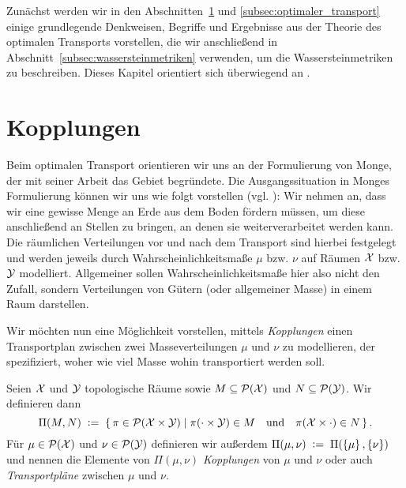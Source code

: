 \documentclass[../thesis/thesis.tex]{subfiles}
\begin{document}
	Zunächst werden wir in den Abschnitten~\ref{subsec:kopplungen} und \ref{subsec:optimaler_transport} einige grundlegende Denkweisen, Begriffe und Ergebnisse aus der Theorie des optimalen Transports vorstellen,
	die wir anschließend in Abschnitt~\ref{subsec:wassersteinmetriken} verwenden, um die Wassersteinmetriken zu beschreiben. Dieses Kapitel orientiert sich überwiegend an \cite[Chapter 4--6]{Villani.2009}.
	
	\section{Kopplungen}
	\label{subsec:kopplungen}
	
	Beim optimalen Transport orientieren wir uns an der Formulierung von Monge, der mit seiner Arbeit \cite{Monge.} das Gebiet begründete.  
	Die Ausgangssituation in Monges Formulierung können wir uns wie folgt vorstellen (vgl. \cite[S. 41--42]{Villani.2009}):
	Wir nehmen an, dass wir eine gewisse Menge an Erde aus dem Boden fördern müssen, um diese anschließend an Stellen zu bringen, an denen sie weiterverarbeitet werden kann. Die räumlichen Verteilungen vor und
	nach dem Transport sind hierbei festgelegt und werden jeweils durch Wahrscheinlichkeitsmaße $\mu$ bzw. $\nu$ auf Räumen $\mathcal{X}$ bzw. $\mathcal{Y}$ modelliert. 
	Allgemeiner sollen Wahrscheinlichkeitsmaße hier also nicht den Zufall, sondern Verteilungen von Gütern (oder allgemeiner Masse) in einem Raum darstellen.
	
	
	
	Wir möchten nun eine Möglichkeit vorstellen, mittels \emph{Kopplungen} einen Transportplan zwischen zwei Masseverteilungen $\mu$ und $\nu$ zu modellieren, der spezifiziert, woher wie viel Masse wohin transportiert werden soll.
	
	\begin{Definition}[Kopplung]
		Seien $\mathcal{X}$ und $\mathcal{Y}$ topologische Räume sowie $M \subseteq \mathcal{P}(\mathcal{X})$ und $N \subseteq \mathcal{P}(\mathcal{Y})$. Wir definieren dann
		\[ \Pi(M, N) \; \vcentcolon = \; \left\{\, \pi \in \mathcal{P}(\mathcal{X} \times \mathcal{Y}) \; \middle| \; \pi(\cdot \times \mathcal{Y}) \in M \quad \text{und} \quad \pi(\mathcal{X} \times \cdot) \in N \,\right\} \text{.}\]
		Für $\mu \in \mathcal{P}(\mathcal{X})$ und $\nu \in \mathcal{P}(\mathcal{Y})$ definieren wir außerdem $\Pi(\mu, \nu) \; \vcentcolon = \; \Pi(\left\{\mu\right\}, \left\{\nu\right\})$ und nennen die
		Elemente von $\Pi(\mu, \nu)$ \emph{Kopplungen} von $\mu$ und $\nu$ oder auch \emph{Transportpläne} zwischen $\mu$ und $\nu$.
	\end{Definition}
\end{document}
